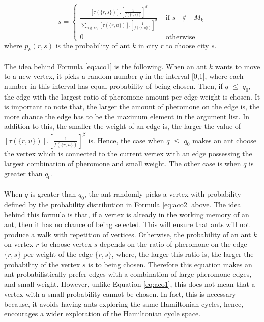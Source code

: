 \documentclass{article}
\begin{document}
\begin{equation}
  \label{eq:aco2}
  s=\begin{cases}
             \displaystyle \frac{[\tau(\{r,s\})].[\frac{1}{f(\{r,s\})}]^\beta}{\sum_{u \notin M_k} [\tau(\{r,u\})].[\frac{1}{f(\{r,u\})}]^\beta } &\text{ if $s$ $\notin$ $M_k$}\\ 
             0 &\text{ 	otherwise}
            \end{cases}
\end{equation}
where $p_k(r,s)$ is the probability of ant $k$ in city $r$ to choose city $s$.\\\\
The idea behind Formula \ref{eq:aco1} is the following. When an ant $k$ wants to move to a new vertex, it picks a random number $q$ in the interval [0,1], where each number in this interval has equal probability of being chosen. Then, if $q$ $\leq$ $q_0$, the edge with the largest ratio of pheromone amount per edge weight is chosen. It is important to note that, the larger the amount of pheromone on the edge is, the more chance the edge has to be the maximum element in the argument list. In addition to this, the smaller the weight of an edge is, the larger the value of $[\tau(\{r,u\})].\left[\frac{1}{f(\{r,u\})}\right]^\beta$ is. Hence, the case when $q$ $\leq$ $q_0$ makes an ant choose the vertex which is connected to the current vertex with an edge possessing the largest combination of pheromone and small weight. The other case is when $q$ is greater than $q_0$. \cite{dorigo_gambardella_1997}\\\\
When $q$ is greater than $q_0$, the ant randomly picks a vertex with probability defined by the probability distribution in Formula \ref{eq:aco2} above. The idea behind this formula is that, if a vertex is already in the working memory of an ant, then it has no chance of being selected. This will ensure that ants will not produce a walk with repetition of vertices. Otherwise, the probability of  an ant $k$ on vertex $r$ to choose vertex $s$ depends on the ratio of pheromone on the edge $\{r,s\}$ per weight of the edge $\{r,s\}$, where, the larger this ratio is, the larger the probability of the vertex $s$ is to being chosen. Therefore this equation makes an ant probabilistically prefer edges with a combination of large pheromone edges, and small weight. However, unlike Equation \ref{eq:aco1}, this does not mean that a vertex with a small probability cannot be chosen. In fact, this is necessary because, it avoids having ants exploring the same Hamiltonian cycles, hence, encourages a wider exploration of the Hamiltonian cycle space. \cite{dorigo_gambardella_1997}\\\\
\end{document}
